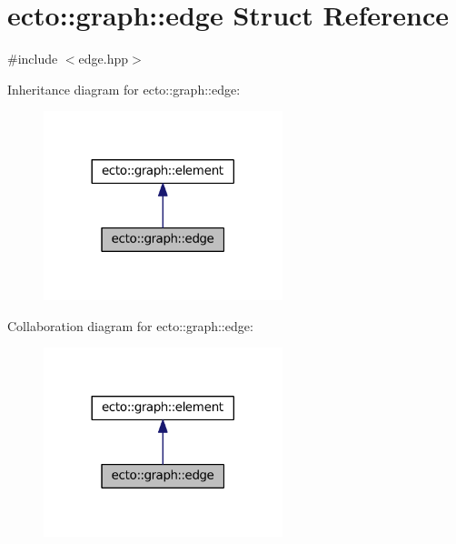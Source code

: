 \hypertarget{structecto_1_1graph_1_1edge}{}\section{ecto\+:\+:graph\+:\+:edge Struct Reference}
\label{structecto_1_1graph_1_1edge}


{\ttfamily \#include $<$edge.\+hpp$>$}



Inheritance diagram for ecto\+:\+:graph\+:\+:edge\+:\nopagebreak
\begin{figure}[H]
\begin{center}
\leavevmode
\includegraphics[width=197pt]{structecto_1_1graph_1_1edge__inherit__graph}
\end{center}
\end{figure}


Collaboration diagram for ecto\+:\+:graph\+:\+:edge\+:\nopagebreak
\begin{figure}[H]
\begin{center}
\leavevmode
\includegraphics[width=197pt]{structecto_1_1graph_1_1edge__coll__graph}
\end{center}
\end{figure}
